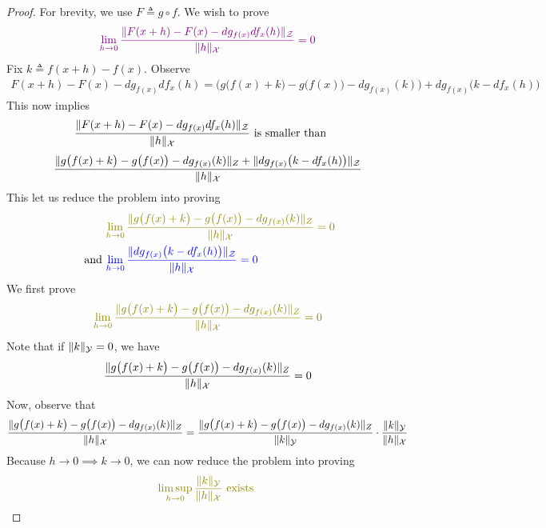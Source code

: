\documentclass{report}
\begin{document}
\begin{proof}
For brevity, we use $F\triangleq g\circ f$. We wish to prove 
\begin{align*}
\textcolor{violet}{\lim_{h\to 0}\frac{\| F(x+h)-F(x)-dg_{f(x)}df_x(h) \|_\mathcal{Z}}{\| h \|_\mathcal{X}}=0}
\end{align*}
Fix $k\triangleq f(x+h)-f(x)$. Observe 
\begin{align*}
 F(x+h)-F(x)-dg_{f(x)}df_x(h)=\Big(g\big(f(x)+k\big)-g\big(f(x)\big)- dg_{f(x)}(k) \Big) + dg_{f(x)}\big(k-df_x(h)\big)
\end{align*}
This now implies 
\begin{align*}
&\frac{\| F(x+h)-F(x)-dg_{f(x)}df_x(h) \|_\mathcal{Z}}{\| h \|_\mathcal{X}}\text{ is smaller than }
\end{align*}
\begin{align*}
\frac{\| g\big(f(x)+k\big)-g\big(f(x)\big)- dg_{f(x)}(k)  \|_Z+ \| dg_{f(x)}\big(k-df_x(h)\big) \|_\mathcal{Z}}{\| h \|_\mathcal{X}} 
\end{align*}
This let us reduce the problem into proving 
\begin{align*}
  &\olive{ \lim_{h\to 0}\frac{\norm{g\big(f(x)+k\big)-g\big(f(x)\big)- dg_{f(x)}(k) }_Z }{\norm{h}_\mathcal{X}} =0}\\
  \text{ and }&\blue{\lim_{h\to 0} \frac{\norm{dg_{f(x)}\big(k-df_x(h) \big)}_\mathcal{Z}}{\norm{h}_\mathcal{X}}=0}
\end{align*}
We first prove 
\begin{align*}
\olive{ \lim_{h\to 0}\frac{\norm{g\big(f(x)+k\big)-g\big(f(x)\big)- dg_{f(x)}(k) }_Z }{\norm{h}_\mathcal{X}} =0}
\end{align*}
Note that if $\| k \|_\mathcal{Y}=0$, we have 
\begin{align*}
\frac{\| g\big(f(x)+k\big)-g\big(f(x)\big)- dg_{f(x)}(k)  \|_Z }{\| h \|_\mathcal{X}} =0
\end{align*}
Now, observe that 
\begin{align*}
\frac{\| g\big(f(x)+k\big)-g\big(f(x)\big)- dg_{f(x)}(k)  \|_Z }{\| h \|_\mathcal{X}} = \frac{\| g\big(f(x)+k\big)-g\big(f(x)\big)- dg_{f(x)}(k)  \|_Z }{\| k \|_\mathcal{Y}}\cdot \frac{\| k \|_\mathcal{Y}}{\| h \|_\mathcal{X}} 
\end{align*}
Because $h \to 0 \implies k\to 0$, we can now reduce the problem into proving 
\begin{align*}
\olive{\limsup_{h\to 0} \frac{\norm{k}_\mathcal{Y}}{\norm{h}_\mathcal{X}}\text{ exists }}
\end{align*}

\end{proof}
\end{document}
